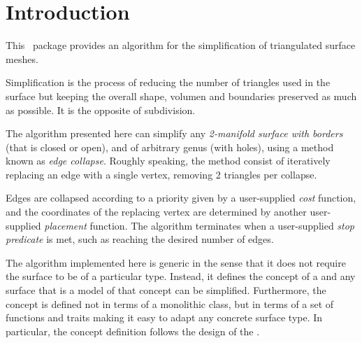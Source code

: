 
\section{Introduction}

This \cgal\ package provides an algorithm for the simplification of triangulated surface meshes.

Simplification is the process of reducing the number of triangles used in the surface but keeping the overall shape, volumen and boundaries preserved as much as possible. It is the opposite of subdivision.


The algorithm presented here can simplify any {\em 2-manifold surface with borders} (that is closed or open), and of arbitrary genus (with holes), using a method known as {\em edge collapse}. Roughly speaking, the method consist of iteratively replacing an edge with a single vertex, removing 2 triangles per collapse.


Edges are collapsed according to a priority given by a user-supplied {\em cost} function, and the coordinates of the replacing vertex are determined by another user-supplied {\em placement} function. The algorithm terminates when a user-supplied {\em stop predicate} is met, such as reaching the desired number of edges.

The algorithm implemented here is generic in the sense that it does not require the surface to be of a particular type. Instead, it defines the concept of a  and any surface that is a model of that concept can be simplified. Furthermore, the concept is defined not in terms of a monolithic class, but in terms of a set of functions and traits making it easy to adapt any concrete surface type. In particular, the concept definition follows the design of the 
 .

